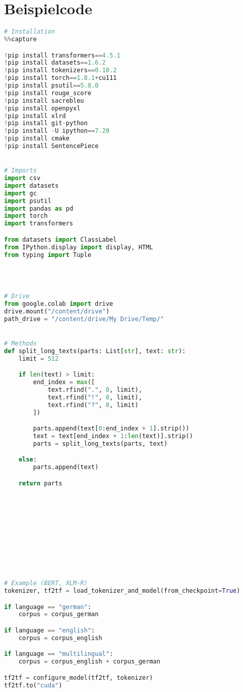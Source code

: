 \section*{Beispielcode}
\begin{lstlisting}[language=Python, caption=Beispielcode]
# Installation
%%capture

!pip install transformers==4.5.1
!pip install datasets==1.6.2
!pip install tokenizers==0.10.2
!pip install torch==1.8.1+cu111
!pip install psutil==5.8.0
!pip install rouge_score
!pip install sacrebleu
!pip install openpyxl
!pip install xlrd
!pip install git-python
!pip install -U ipython==7.20
!pip install cmake
!pip install SentencePiece


# Imports
import csv
import datasets
import gc
import psutil
import pandas as pd
import torch
import transformers

from datasets import ClassLabel
from IPython.display import display, HTML
from typing import Tuple




# Drive
from google.colab import drive
drive.mount("/content/drive")
path_drive = "/content/drive/My Drive/Temp/"


# Methods
def split_long_texts(parts: List[str], text: str):
    limit = 512

    if len(text) > limit:
        end_index = max([
            text.rfind(".", 0, limit),
            text.rfind("!", 0, limit),
            text.rfind("?", 0, limit)
        ])

        parts.append(text[0:end_index + 1].strip())
        text = text[end_index + 1:len(text)].strip()
        parts = split_long_texts(parts, text)

    else:
        parts.append(text)

    return parts
    










# Example (BERT, XLM-R)
tokenizer, tf2tf = load_tokenizer_and_model(from_checkpoint=True)

if language == "german":
    corpus = corpus_german

if language == "english":
    corpus = corpus_english

if language == "multilingual":
    corpus = corpus_english + corpus_german

tf2tf = configure_model(tf2tf, tokenizer)
tf2tf.to("cuda")


\end{lstlisting}
